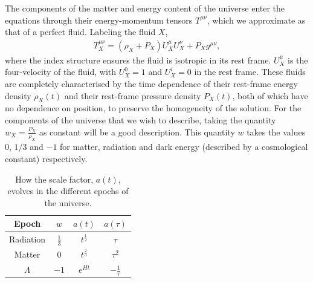     The components of the matter and energy content of the universe enter the equations through
    their energy-momentum tensors $T^{\mu\nu}$, which we approximate as that of
    a perfect fluid. Labeling the fluid $X$,
    \begin{align}\label{stress_tensor}
        T_X^{\mu\nu} = (\rho_X+P_X)U_X^\mu U_X^\nu+P_Xg^{\mu\nu},
    \end{align}
    where the index structure ensures the fluid is isotropic in its rest frame.
    $U_X^\mu$ is the four-velocity of the fluid, with $U_X^0=1$ and $U_X^i=0$
    in the rest frame.
    These fluids are completely characterised by the time dependence
    of their rest-frame energy density $\rho_X(t)$ and their rest-frame
    pressure density $P_X(t)$,
    both of which have no dependence on position, to preserve the homogeneity of the solution.
    For the components of the universe that we wish to describe,
    taking the quantity $w_X=\frac{P_X}{\rho_X}$ as constant will be a good description.
    This quantity $w$ takes the values $0$, $1/3$ and $-1$ for matter, radiation
    and dark energy (described by a cosmological constant) respectively.


    \begin{table}[h!]
    \begin{center}
        \begin{tabular}{ c c c c }
            Epoch & $w$ & $a(t)$ & $a(\tau)$ \\ 
            \toprule
            Radiation & $\frac{1}{3}$ & $t^{\frac{1}{2}}$ & $\tau$ \\
            Matter & $0$ & $t^{\frac{2}{3}}$ & $\tau^2$ \\
            $\Lambda$ & $-1$ & $e^{Ht}$ & $-\frac{1}{\tau}$
        \end{tabular}\caption{
            How the scale factor, $a(t)$, evolves in the
            different epochs of the universe.
        }\label{lcdm_dep_table}
    \end{center}
    \end{table}


